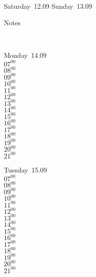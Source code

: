 \documentclass[11pt,a4paper]{book}\usepackage[]{graphicx}\usepackage[]{color}
\begin{document}
{{{{{{{{{{{\begin{tcolorbox}
\end{tcolorbox} 
\begin{tcolorbox}[height=(\textheight-10mm)/6]
Saturday~12.09
\tcblower
Sunday~13.09
\end{tcolorbox} %
\begin{tcolorbox}[height=(\textheight-10mm)/6,sidebyside=false]
Notes
\end{tcolorbox}
\clearpage
\vspace{2 mm}\\
\begin{tcolorbox}
Monday~14.09\\
{ 
  $07^{00}$\\
$08^{00}$\\
$09^{00}$\\
$10^{00}$\\
$11^{00}$\\
$12^{00}$\\
$13^{00}$\\
$14^{00}$\\
$15^{00}$\\
$16^{00}$\\
$17^{00}$\\
$18^{00}$\\
$19^{00}$\\
$20^{00}$\\
$21^{00}$}\\

\end{tcolorbox}
\begin{tcolorbox}
Tuesday~15.09\\
{ 
  $07^{00}$\\
$08^{00}$\\
$09^{00}$\\
$10^{00}$\\
$11^{00}$\\
$12^{00}$\\
$13^{00}$\\
$14^{00}$\\
$15^{00}$\\
$16^{00}$\\
$17^{00}$\\
$18^{00}$\\
$19^{00}$\\
$20^{00}$\\
$21^{00}$}\\


\end{tcolorbox}}}}}}}}}}}}
\end{document}
